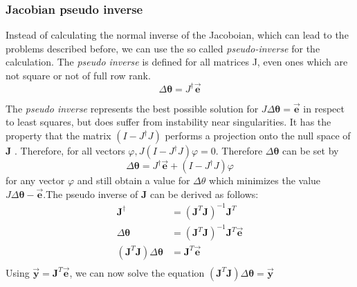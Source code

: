 \subsubsection{Jacobian pseudo inverse}
Instead of calculating the normal inverse of the Jacoboian, which can lead to the problems described before, we can use the so called \textit{pseudo-inverse}\cite{Dahmen.2008} for the calculation. The \textit{pseudo inverse} is defined for all matrices J, even ones
which are not square or not of full row rank.
\begin{equation}
\label{pseudo inv def}
\Delta\pmb{\theta}=J^{\dagger}\vec{\pmb{e}}
\end{equation}

The \textit{pseudo inverse} represents the best possible solution for $ J\Delta\pmb{\theta}=\vec{\pmb{e}}$ in respect to least squares, but does suffer from instability near singularities. It has the property that the matrix $(I − J^{\dagger}J)$ performs a projection onto the null space of \textbf{J} . Therefore, for all vectors $\varphi, J(I −J^{\dagger}J)\varphi = 0$. Therefore $\Delta\pmb{\theta}$ can be set by
\begin{equation}
\Delta\pmb{\theta}=J^{\dagger}\vec{\pmb{e}}+(I-J^{\dagger}J)\varphi
\end{equation}
for any vector $\varphi$ and still obtain a value for $\Delta\theta$ which minimizes the value $ J\Delta\pmb{\theta} −\vec{\pmb{e}}$.The pseudo inverse of \textbf{J} can be derived as follows:
\begin{equation}
\begin{split}
\pmb{J}^{\dagger}&=(\pmb{J}^{T}\pmb{J})^{-1}\pmb{J}^{T}\\
\Delta\pmb{\theta}&=(\pmb{J}^{T}\pmb{J})^{-1}\pmb{J}^{T}\vec{\pmb{e}}\\
(\pmb{J}^{T}\pmb{J})\Delta\pmb{\theta}&=\pmb{J}^{T}\vec{\pmb{e}}\\
\end{split}
\end{equation}
Using $\vec{\pmb{y}}=\pmb{J}^{T}\vec{\pmb{e}}$, we can now solve the equation $(\pmb{J}^{T}\pmb{J})\Delta\pmb{\theta}=\vec{\pmb{y}}$

